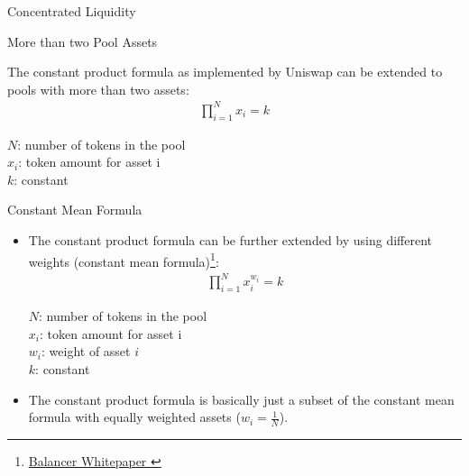 \documentclass[]{beamer}
\begin{document}
\begin{frame}{Concentrated Liquidity}
	\begin{figure}[h!]
		\begin{center}
			
		\end{center}
	\end{figure}	
\end{frame}


\begin{frame}{More than two Pool Assets}

The constant product formula as implemented by Uniswap can be extended to pools with more than two assets:
		\begin{align*}
			\prod_{i=1}^N x_i= k
		\end{align*}
		
$N$: number of tokens in the pool\\
$x_i$: token amount for asset i\\
$k$: constant

\end{frame}


\begin{frame}{Constant Mean Formula}
\begin{itemize}
	\item The constant product formula can be further extended by using different weights (constant mean formula)\footnote{\href{https://balancer.fi/whitepaper.pdf}{Balancer Whitepaper \link}}:
		\begin{align*}
			\prod_{i=1}^N x_i^{w_i}= k
		\end{align*}

		$N$: number of tokens in the pool\\
		$x_i$: token amount for asset i\\
		$w_i$: weight of asset $i$\\
		$k$: constant
		\vspace{0.5cm}
	\item The constant product formula is basically just a subset of the constant mean formula with equally weighted assets ($w_i = \tfrac{1}{N}$).
\end{itemize}

\end{frame}
\end{document}
